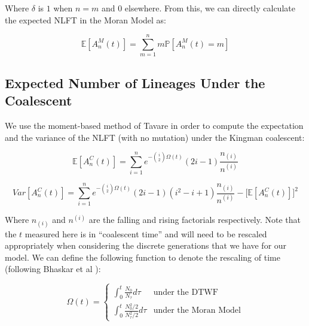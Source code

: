 \documentclass[11pt]{article}
\begin{document}
 Where $\delta$ is $1$ when $n = m$ and $0$ elsewhere. From this, we can directly calculate the expected NLFT in the Moran Model as:

 \begin{equation}
	 \mathbb{E}[A^M_n(t)] = \sum^n_{m=1} m \mathbb{P}[A^M_n (t) = m]
 \end{equation}

\subsection*{Expected Number of Lineages Under the Coalescent}

We use the moment-based method of Tavare \cite{Tavare1984} in order to compute the expectation and the variance of the NLFT (with no mutation) under the Kingman coalescent:

\begin{equation}
	\mathbb{E}[A^C_n(t)] = \sum^n_{i=1} e^{-\binom{i}{2}\Omega(t)} (2i - 1) \frac{n_{(i)}}{n^{(i)}} 
\end{equation}

\begin{equation}
	Var[A^C_n(t)] = \sum^n_{i=1} e^{-\binom{i}{2}\Omega(t)}(2i-1)(i^2 - i + 1)\frac{n_{(i)}}{n^{(i)}} - \Bigg[\mathbb{E}[A^C_n(t)]\Bigg]^2
\end{equation}

Where $n_{(i)}$ and $n^{(i)}$ are the falling and rising factorials respectively. Note that the $t$ measured here is in ``coalescent time'' and will need to be rescaled appropriately when considering the discrete generations that we have for our model. We can define the following function to denote the rescaling of time (following Bhaskar et al \cite{Bhaskar2014}):

\begin{equation}
	\Omega(t) = \begin{cases}
		\int_{0}^t \frac{N_0}{N_\tau} d\tau &\text{under the DTWF}\\[2ex]
		\int_{0}^t \frac{N_0^2/2}{N_\tau^2/2} d\tau  &\text{under the Moran Model}
	\end{cases}
\end{equation}


\end{document}
